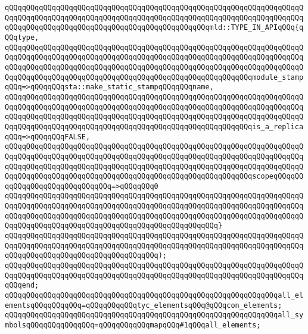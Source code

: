 \verb|qQQqqQQqqQQqqQQqqQQqqQQqqQQqqQQqqQQqqQQqqQQqqQQqqQQqqQQqqQQqqQQqqQQqqQQqqQQqqQQqqQQqqQQqqQQqqQQqqQQqqQQqqQQqqQQqqQQqqQQqqQQqqQQqqQQqqQQqqQQqqQQqqQQqqQQqqQQqqQQqqQQqqQQqqQQqqQQqqQQqqQQqqQQqmld::TYPE_IN_APIqQQq{qQQqtype,|\newline
\verb|qQQqqQQqqQQqqQQqqQQqqQQqqQQqqQQqqQQqqQQqqQQqqQQqqQQqqQQqqQQqqQQqqQQqqQQqqQQqqQQqqQQqqQQqqQQqqQQqqQQqqQQqqQQqqQQqqQQqqQQqqQQqqQQqqQQqqQQqqQQqqQQqqQQqqQQqqQQqqQQqqQQqqQQqqQQqqQQqqQQqqQQqqQQqqQQqqQQqqQQqqQQqqQQqqQQqqQQqqQQqqQQqqQQqqQQqqQQqqQQqqQQqqQQqqQQqqQQqqQQqqQQqqQQqmodule_stampqQQq=>qQQqqQQqsta::make_static_stampqQQqqQQqname,|\newline
\verb|qQQqqQQqqQQqqQQqqQQqqQQqqQQqqQQqqQQqqQQqqQQqqQQqqQQqqQQqqQQqqQQqqQQqqQQqqQQqqQQqqQQqqQQqqQQqqQQqqQQqqQQqqQQqqQQqqQQqqQQqqQQqqQQqqQQqqQQqqQQqqQQqqQQqqQQqqQQqqQQqqQQqqQQqqQQqqQQqqQQqqQQqqQQqqQQqqQQqqQQqqQQqqQQqqQQqqQQqqQQqqQQqqQQqqQQqqQQqqQQqqQQqqQQqqQQqqQQqqQQqqQQqqQQqis_a_replicaqQQq=>qQQqqQQqFALSE,|\newline
\verb|qQQqqQQqqQQqqQQqqQQqqQQqqQQqqQQqqQQqqQQqqQQqqQQqqQQqqQQqqQQqqQQqqQQqqQQqqQQqqQQqqQQqqQQqqQQqqQQqqQQqqQQqqQQqqQQqqQQqqQQqqQQqqQQqqQQqqQQqqQQqqQQqqQQqqQQqqQQqqQQqqQQqqQQqqQQqqQQqqQQqqQQqqQQqqQQqqQQqqQQqqQQqqQQqqQQqqQQqqQQqqQQqqQQqqQQqqQQqqQQqqQQqqQQqqQQqqQQqqQQqqQQqqQQqscopeqQQqqQQqqQQqqQQqqQQqqQQqqQQqqQQq=>qQQqqQQq0|\newline
\verb|qQQqqQQqqQQqqQQqqQQqqQQqqQQqqQQqqQQqqQQqqQQqqQQqqQQqqQQqqQQqqQQqqQQqqQQqqQQqqQQqqQQqqQQqqQQqqQQqqQQqqQQqqQQqqQQqqQQqqQQqqQQqqQQqqQQqqQQqqQQqqQQqqQQqqQQqqQQqqQQqqQQqqQQqqQQqqQQqqQQqqQQqqQQqqQQqqQQqqQQqqQQqqQQqqQQqqQQqqQQqqQQqqQQqqQQqqQQqqQQqqQQqqQQqqQQqqQQqqQQq}|\newline
\verb|qQQqqQQqqQQqqQQqqQQqqQQqqQQqqQQqqQQqqQQqqQQqqQQqqQQqqQQqqQQqqQQqqQQqqQQqqQQqqQQqqQQqqQQqqQQqqQQqqQQqqQQqqQQqqQQqqQQqqQQqqQQqqQQqqQQqqQQqqQQqqQQqqQQqqQQqqQQqqQQqqQQqqQQqqQQqqQQq);|\newline
\verb|qQQqqQQqqQQqqQQqqQQqqQQqqQQqqQQqqQQqqQQqqQQqqQQqqQQqqQQqqQQqqQQqqQQqqQQqqQQqqQQqqQQqqQQqqQQqqQQqqQQqqQQqqQQqqQQqqQQqqQQqqQQqqQQqqQQqqQQqqQQqqQQqend;|\newline
\newline
\newline
\verb|qQQqqQQqqQQqqQQqqQQqqQQqqQQqqQQqqQQqqQQqqQQqqQQqqQQqqQQqqQQqqQQqall_elementsqQQqqQQqqQQq=qQQqqQQqqQQqtyc_elementsqQQq@qQQqcon_elements;|\newline
\verb|qQQqqQQqqQQqqQQqqQQqqQQqqQQqqQQqqQQqqQQqqQQqqQQqqQQqqQQqqQQqqQQqall_symbolsqQQqqQQqqQQqqQQq=qQQqqQQqqQQqmapqQQq#1qQQqall_elements;|\newline
